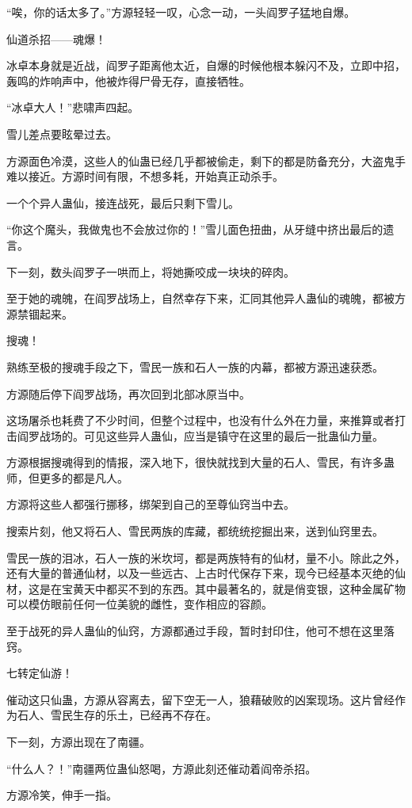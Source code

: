 \begin{this_body}
“唉，你的话太多了。”方源轻轻一叹，心念一动，一头阎罗子猛地自爆。

仙道杀招——魂爆！

冰卓本身就是近战，阎罗子距离他太近，自爆的时候他根本躲闪不及，立即中招，轰鸣的炸响声中，他被炸得尸骨无存，直接牺牲。

“冰卓大人！”悲啸声四起。

雪儿差点要眩晕过去。

方源面色冷漠，这些人的仙蛊已经几乎都被偷走，剩下的都是防备充分，大盗鬼手难以接近。方源时间有限，不想多耗，开始真正动杀手。

一个个异人蛊仙，接连战死，最后只剩下雪儿。

“你这个魔头，我做鬼也不会放过你的！”雪儿面色扭曲，从牙缝中挤出最后的遗言。

下一刻，数头阎罗子一哄而上，将她撕咬成一块块的碎肉。

至于她的魂魄，在阎罗战场上，自然幸存下来，汇同其他异人蛊仙的魂魄，都被方源禁锢起来。

搜魂！

熟练至极的搜魂手段之下，雪民一族和石人一族的内幕，都被方源迅速获悉。

方源随后停下阎罗战场，再次回到北部冰原当中。

这场屠杀也耗费了不少时间，但整个过程中，也没有什么外在力量，来推算或者打击阎罗战场的。可见这些异人蛊仙，应当是镇守在这里的最后一批蛊仙力量。

方源根据搜魂得到的情报，深入地下，很快就找到大量的石人、雪民，有许多蛊师，但更多的都是凡人。

方源将这些人都强行挪移，绑架到自己的至尊仙窍当中去。

搜索片刻，他又将石人、雪民两族的库藏，都统统挖掘出来，送到仙窍里去。

雪民一族的泪冰，石人一族的米坎坷，都是两族特有的仙材，量不小。除此之外，还有大量的普通仙材，以及一些远古、上古时代保存下来，现今已经基本灭绝的仙材，这是在宝黄天中都买不到的东西。其中最著名的，就是俏变银，这种金属矿物可以模仿眼前任何一位美貌的雌性，变作相应的容颜。

至于战死的异人蛊仙的仙窍，方源都通过手段，暂时封印住，他可不想在这里落窍。

七转定仙游！

催动这只仙蛊，方源从容离去，留下空无一人，狼藉破败的凶案现场。这片曾经作为石人、雪民生存的乐土，已经再不存在。

下一刻，方源出现在了南疆。

“什么人？！”南疆两位蛊仙怒喝，方源此刻还催动着阎帝杀招。

方源冷笑，伸手一指。


\end{this_body}
